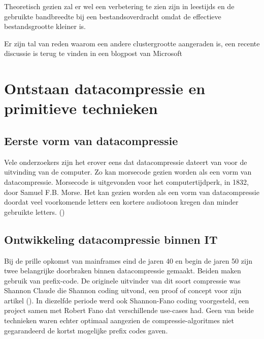 Theoretisch gezien zal er wel een verbetering te zien zijn in \glspl{leestijd} en de gebruikte \gls{bandbreedte} bij een bestandsoverdracht omdat de effectieve bestandsgrootte kleiner is. 

Er zijn tal van reden waarom een andere \gls{clustergrootte} aangeraden is, een recente discussie is terug te vinden in een blogpost van Microsoft

\section{Ontstaan datacompressie en primitieve technieken}
\label{sec:ontstaan-datacompressie-primitieve-technieken}
\subsection{Eerste vorm van datacompressie}
\label{sec:ontstaan-datacompressie-primitieve-technieken-eerste-vorm}
Vele onderzoekers zijn het erover eens dat \gls{datacompressie} dateert van voor de uitvinding van de computer. Zo kan morsecode gezien worden als een vorm van \gls{datacompressie}. Morsecode is uitgevonden voor het computertijdperk, in 1832, door Samuel F.B. Morse. Het kan gezien worden als een vorm van datacompressie doordat veel voorkomende letters een kortere audiotoon kregen dan minder gebruikte letters. (\cite{morsecode})

\subsection{Ontwikkeling datacompressie binnen IT}
\label{sec:ontstaan-datacompressie-primitieve-technieken-binnen-it}

Bij de prille opkomst van mainframes eind de jaren 40 en begin de jaren 50 zijn twee belangrijke doorbraken binnen \gls{datacompressie} gemaakt. Beiden maken gebruik van \gls{prefix-code}. De originele uitvinder van dit soort compressie was Shannon Claude die Shannon coding uitvond, een proof of concept voor zijn artikel  (\cite{shannon1948}). In diezelfde periode werd ook Shannon-Fano coding voorgesteld, een project samen met Robert Fano dat verschillende \glspl{use-case} had. Geen van beide technieken waren echter optimaal aangezien de \glspl{compressie-algoritme} niet gegarandeerd de kortst mogelijke prefix codes gaven. 

